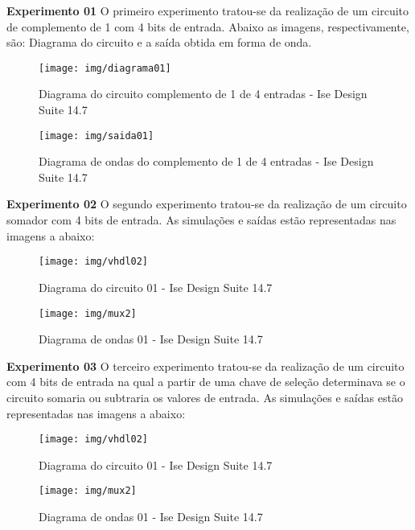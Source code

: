 \documentclass[12pts]{article}
\begin{document}
\textbf{Experimento 01}
\singlespacing
	O primeiro experimento tratou-se da realização de um circuito de complemento de 1 com 4 bits de entrada. Abaixo as imagens, respectivamente, são: Diagrama do circuito e a saída obtida em forma de onda.

\begin{figure}[!htb]
  \centering
  \texttt{[image: img/diagrama01]}
  \caption{Diagrama do circuito complemento de 1 de 4 entradas - Ise Design Suite 14.7}
  \label{figRotulo}
\end{figure}

\begin{figure}[!htb]
  \centering
  \texttt{[image: img/saida01]}
  \caption{Diagrama de ondas do complemento de 1 de 4 entradas - Ise Design Suite 14.7}
  \label{figRotulo}
\end{figure}
\newpage

\textbf{Experimento 02}
\singlespacing
O segundo experimento tratou-se da realização de um circuito somador com 4 bits de entrada. As simulações e saídas estão representadas nas imagens a abaixo:


\begin{figure}[!htb]
  \centering
  \texttt{[image: img/vhdl02]}
  \caption{Diagrama do circuito 01 - Ise Design Suite 14.7}
  \label{figRotulo}
\end{figure}

\begin{figure}[!htb]
  \centering
  \texttt{[image: img/mux2]}
  \caption{Diagrama de ondas 01 - Ise Design Suite 14.7}
  \label{figRotulo}
\end{figure}

\newpage

\textbf{Experimento 03}
\singlespacing
O terceiro experimento tratou-se da realização de um circuito com 4 bits de entrada na qual a partir de uma chave de seleção determinava se o circuito somaria ou subtraria os valores de entrada. As simulações e saídas estão representadas nas imagens a abaixo:

\begin{figure}[!htb]
  \centering
  \texttt{[image: img/vhdl02]}
  \caption{Diagrama do circuito 01 - Ise Design Suite 14.7}
  \label{figRotulo}
\end{figure}

\begin{figure}[!htb]
  \centering
  \texttt{[image: img/mux2]}
  \caption{Diagrama de ondas 01 - Ise Design Suite 14.7}
  \label{figRotulo}
\end{figure}
\end{document}
